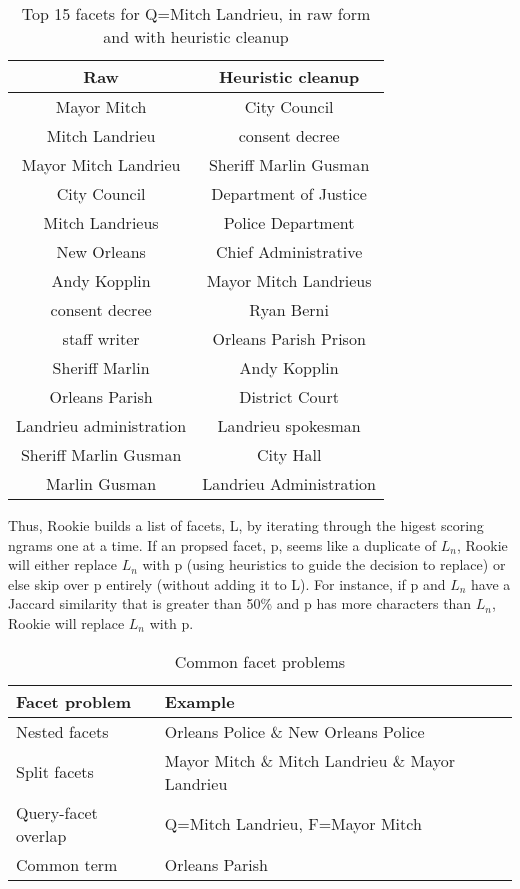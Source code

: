 \documentclass{article}
\begin{document}
\begin{table}[h!]
\begin{center}
\begin{tabular}{ c c }
 Raw & Heuristic cleanup  \\ 
 \hline
 Mayor Mitch & City Council  \\ 
 Mitch Landrieu & consent decree \\  
 Mayor Mitch Landrieu & Sheriff Marlin Gusman \\
 City Council & Department of Justice \\
 Mitch Landrieus & Police Department \\   
 New Orleans & Chief Administrative \\   
 Andy Kopplin & Mayor Mitch Landrieus \\
 consent decree & Ryan Berni \\    
 staff writer & Orleans Parish Prison \\   
 Sheriff Marlin & Andy Kopplin \\   
 Orleans Parish & District Court \\
 Landrieu administration & Landrieu spokesman \\  
 Sheriff Marlin Gusman & City Hall \\  
 Marlin Gusman & Landrieu Administration \\   

\end{tabular}
\caption{Top 15 facets for Q=Mitch Landrieu, in raw form and with heuristic cleanup}
\end{center}
\label{t1:one}
\end{table}

Thus, Rookie builds a list of facets, L, by iterating through the higest scoring ngrams one at a time. If an propsed facet, p, seems like a duplicate of $L_n$, Rookie will either replace $L_n$ with p (using heuristics to guide the decision to replace) or else skip over p entirely (without adding it to L). For instance, if p and $L_n$ have a Jaccard similarity that is greater than 50\% and p has more characters than $L_n$, Rookie will replace $L_n$ with p.

\begin{table}[h!]
\begin{center}
\begin{tabular}{ l l }
 Facet problem & Example \\ 
 \hline
 Nested facets & Orleans Police \& New Orleans Police  \\ 
 Split facets & Mayor Mitch \& Mitch Landrieu \& Mayor Landrieu \\  
 Query-facet overlap & Q=Mitch Landrieu, F=Mayor Mitch \\
 Common term & Orleans Parish

\end{tabular}
\caption{Common facet problems}
\end{center}
\label{t2:two}
\end{table}
\end{document}

